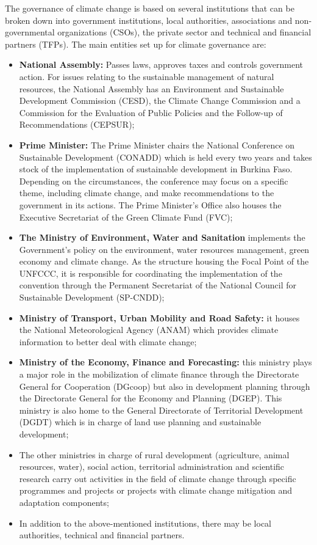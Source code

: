 \documentclass[
]{book}
\begin{document}
The governance of climate change is based on several institutions that can be broken down into government institutions, local authorities, associations and non-governmental organizations (CSOs), the private sector and technical and financial partners (TFPs). The main entities set up for climate governance are:

\begin{itemize}
\item
  \textbf{National Assembly:} Passes laws, approves taxes and controls government action. For issues relating to the sustainable management of natural resources, the National Assembly has an Environment and Sustainable Development Commission (CESD), the Climate Change Commission and a Commission for the Evaluation of Public Policies and the Follow-up of Recommendations (CEPSUR);
\item
  \textbf{Prime Minister:} The Prime Minister chairs the National Conference on Sustainable Development (CONADD) which is held every two years and takes stock of the implementation of sustainable development in Burkina Faso. Depending on the circumstances, the conference may focus on a specific theme, including climate change, and make recommendations to the government in its actions. The Prime Minister's Office also houses the Executive Secretariat of the Green Climate Fund (FVC);
\item
  \textbf{The Ministry of Environment, Water and Sanitation} implements the Government's policy on the environment, water resources management, green economy and climate change. As the structure housing the Focal Point of the UNFCCC, it is responsible for coordinating the implementation of the convention through the Permanent Secretariat of the National Council for Sustainable Development (SP-CNDD);
\item
  \textbf{Ministry of Transport, Urban Mobility and Road Safety:} it houses the National Meteorological Agency (ANAM) which provides climate information to better deal with climate change;
\item
  \textbf{Ministry of the Economy, Finance and Forecasting:} this ministry plays a major role in the mobilization of climate finance through the Directorate General for Cooperation (DGcoop) but also in development planning through the Directorate General for the Economy and Planning (DGEP). This ministry is also home to the General Directorate of Territorial Development (DGDT) which is in charge of land use planning and sustainable development;
\item
  The other ministries in charge of rural development (agriculture, animal resources, water), social action, territorial administration and scientific research carry out activities in the field of climate change through specific programmes and projects or projects with climate change mitigation and adaptation components;
\item
  In addition to the above-mentioned institutions, there may be local authorities, technical and financial partners.
\end{itemize}
\end{document}
